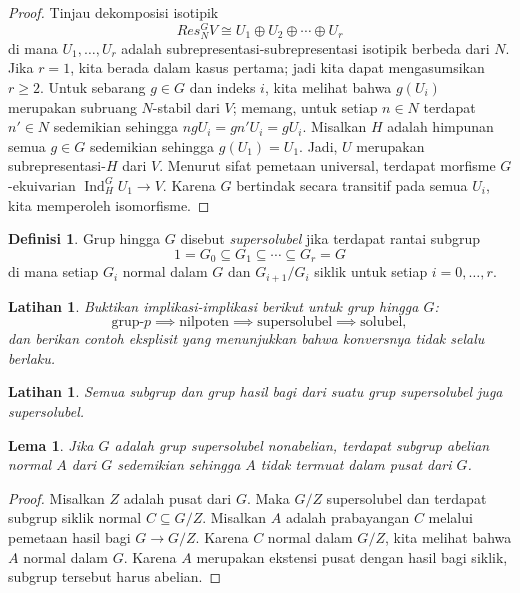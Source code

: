 \documentclass[12pt]{article}
\theoremstyle{plain}
\newtheorem{lemma}[theorem]{Lema}
\newtheorem{exercise}[theorem]{Latihan}
\theoremstyle{definition}
\newtheorem{definition}[theorem]{Definisi}
\theoremstyle{remark}
\numberwithin{equation}{section}
\begin{document}
\begin{proof}
Tinjau dekomposisi isotipik
\[
Res^G_N V \cong U_1 \oplus U_2 \oplus \cdots \oplus U_r
\]
di mana $U_1, \ldots, U_r$ adalah subrepresentasi-subrepresentasi isotipik berbeda dari $N$.
Jika $r=1$, kita berada dalam kasus pertama; jadi kita dapat mengasumsikan $r \ge 2$.
Untuk sebarang $g \in G$ dan indeks $i$, kita melihat bahwa $g(U_i)$ merupakan subruang
$N$-stabil dari $V$; memang, untuk setiap $n\in N$ terdapat $n' \in N$
sedemikian sehingga $ngU_i=gn'U_i=gU_i$.
Misalkan $H$ adalah himpunan semua $g \in G$ sedemikian sehingga $g(U_1)=U_1$.
Jadi, $U$ merupakan subrepresentasi-$H$ dari $V$.
Menurut sifat pemetaan universal, terdapat morfisme $G$-ekuivarian
$\operatorname{Ind}^G_H U_1 \to V$.
Karena $G$ bertindak secara transitif pada semua $U_i$, kita memperoleh isomorfisme.
\end{proof}

\begin{definition}
Grup hingga $G$ disebut \emph{supersolubel} jika terdapat rantai
subgrup
\[
1=G_0 \subseteq G_1 \subseteq \cdots \subseteq G_r = G
\]
di mana setiap $G_i$ normal dalam $G$ dan $G_{i+1}/G_i$ siklik
untuk setiap $i=0,\ldots, r$.
\end{definition}

\begin{exercise}
Buktikan implikasi-implikasi berikut untuk grup hingga $G$:
\[
\textrm{grup-$p$} \implies
\textrm{nilpoten} \implies \textrm{supersolubel} \implies
\textrm{solubel},
\]
dan berikan contoh eksplisit yang menunjukkan bahwa konversnya tidak selalu berlaku.
\end{exercise}

\begin{exercise}
Semua subgrup dan grup hasil bagi dari suatu grup supersolubel juga
supersolubel.
\end{exercise}

\begin{lemma} \label{lem:ss_abel}
Jika $G$ adalah grup supersolubel nonabelian, terdapat subgrup abelian normal
$A$ dari $G$ sedemikian sehingga $A$ tidak termuat dalam pusat
dari $G$.
\end{lemma}

\begin{proof}
Misalkan $Z$ adalah pusat dari $G$. Maka $G/Z$ supersolubel dan
terdapat subgrup siklik normal $C \subseteq G/Z$. Misalkan $A$ adalah
prabayangan $C$ melalui pemetaan hasil bagi $G \to G/Z$.
Karena $C$ normal dalam $G/Z$, kita melihat bahwa $A$ normal dalam $G$.
Karena $A$ merupakan ekstensi pusat dengan hasil bagi siklik, subgrup tersebut harus
abelian.
\end{proof}
\end{document}
